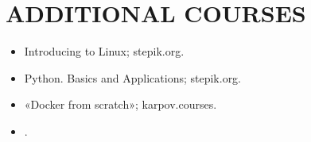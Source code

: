 \section{ADDITIONAL COURSES}

    \begin{itemize}
        \setlength\itemsep{-.5em}
        \item Introducing to Linux; stepik.org.
        \item Python. Basics and Applications; stepik.org.
        \item «Docker from scratch»; karpov.courses.
        \item {}.
    \end{itemize}
    
    \vspace{-.4em}
